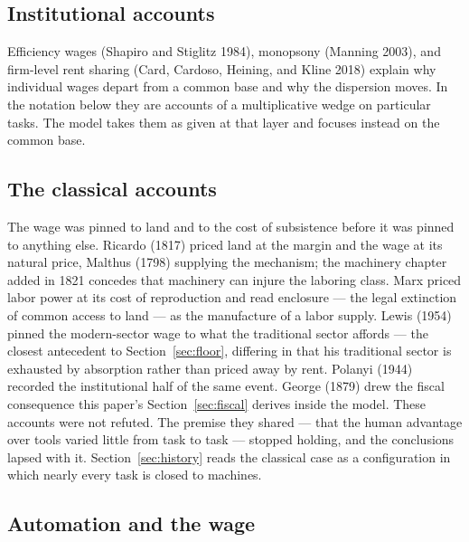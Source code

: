 \documentclass[12pt]{article}
\theoremstyle{plain}
\begin{document}
\subsection{Institutional accounts}\label{sec:institutions}

Efficiency wages (Shapiro and Stiglitz 1984), monopsony (Manning 2003), and firm-level rent sharing (Card, Cardoso, Heining, and Kline 2018) explain why individual wages depart from a common base and why the dispersion moves. In the notation below they are accounts of a multiplicative wedge on particular tasks. The model takes them as given at that layer and focuses instead on the common base.

\subsection{The classical accounts}\label{sec:classical}

The wage was pinned to land and to the cost of subsistence before it was pinned to anything else. Ricardo (1817) priced land at the margin and the wage at its natural price, Malthus (1798) supplying the mechanism; the machinery chapter added in 1821 concedes that machinery can injure the laboring class. Marx priced labor power at its cost of reproduction and read enclosure --- the legal extinction of common access to land --- as the manufacture of a labor supply. Lewis (1954) pinned the modern-sector wage to what the traditional sector affords --- the closest antecedent to Section~\ref{sec:floor}, differing in that his traditional sector is exhausted by absorption rather than priced away by rent. Polanyi (1944) recorded the institutional half of the same event. George (1879) drew the fiscal consequence this paper's Section~\ref{sec:fiscal} derives inside the model. These accounts were not refuted. The premise they shared --- that the human advantage over tools varied little from task to task --- stopped holding, and the conclusions lapsed with it. Section~\ref{sec:history} reads the classical case as a configuration in
which nearly every task is closed to machines.

\subsection{Automation and the wage}\label{sec:automation}
\end{document}
